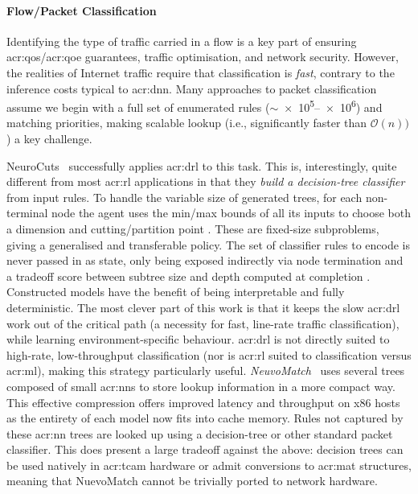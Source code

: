 \paragraph{Flow/Packet Classification}
Identifying the type of traffic carried in a flow is a key part of ensuring \gls{acr:qos}/\gls{acr:qoe} guarantees, traffic optimisation, and network security.
However, the realities of Internet traffic require that classification is \emph{fast}, contrary to the inference costs typical to \gls{acr:dnn}.
Many approaches to packet classification assume we begin with a full set of enumerated rules ($\sim$\numrange{e5}{e6}) and matching priorities, making scalable lookup (i.e., significantly faster than $\mathcal{O}\left(n\right))$) a key challenge.

NeuroCuts~\parencite{DBLP:conf/sigcomm/LiangZJS19} successfully applies \gls{acr:drl} to this task.
This is, interestingly, quite different from most \gls{acr:rl} applications in that they \emph{build a decision-tree classifier} from input rules.
To handle the variable size of generated trees, for each non-terminal node the agent uses the min/max bounds of all its inputs \prllitstate{} to choose both a dimension and cutting/partition point \prllitact{}.
These are fixed-size subproblems, giving a generalised and transferable policy.
The set of classifier rules to encode is never passed in as state, only being exposed indirectly via node termination and a tradeoff score between subtree size and depth computed at completion \prllitreward.
Constructed models have the benefit of being interpretable and fully deterministic.
The most clever part of this work is that it keeps the slow \gls{acr:drl} work out of the critical path (a necessity for fast, line-rate traffic classification), while learning environment-specific behaviour.
\gls{acr:drl} is not directly suited to high-rate, low-throughput classification (nor is \gls{acr:rl} suited to classification versus \gls{acr:ml}), making this strategy particularly useful.
\emph{NeuvoMatch}~\parencite{DBLP:conf/sigcomm/RashelbachRS20} uses several trees composed of small \glspl{acr:nn} to store lookup information in a more compact way.
This effective compression offers improved latency and throughput on x86 hosts as the entirety of each model now fits into cache memory.
Rules not captured by these \gls{acr:nn} trees are looked up using a decision-tree or other standard packet classifier.
This does present a large tradeoff against the above: decision trees can be used natively in \gls{acr:tcam} hardware or admit conversions to \gls{acr:mat} structures, meaning that NuevoMatch cannot be trivially ported to network hardware.

